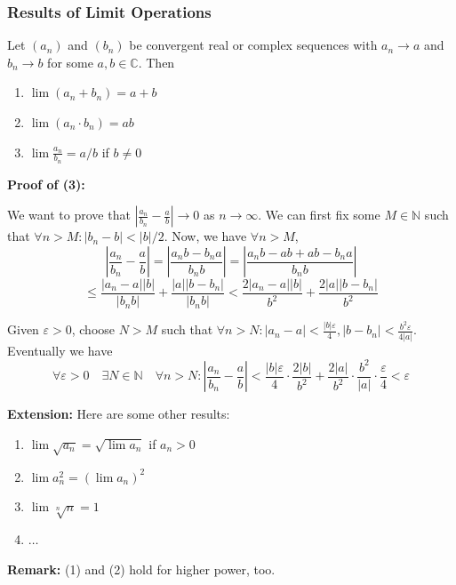 \documentclass[10pt, t]{beamer}
\newcommand{\N}{\mathbb{N}}
\begin{document}
\begin{frame}[allowframebreaks]
    \frametitle{Results of Limit Operations}
    Let $\left(a_{n}\right)$ and $\left(b_{n}\right)$ be convergent real or complex sequences with $a_{n} \rightarrow a$ and $b_{n} \rightarrow b$ for some $a, b \in \mathbb{C}$. Then
    \begin{enumerate}[(1)]
        \item 
        $\lim \left(a_{n}+b_{n}\right)=a+b$
        \item
        $\lim \left(a_{n} \cdot b_{n}\right)=a b$
        \item
        $\lim \frac{a_{n}}{b_{n}}=a / b$ if $b \neq 0$
    \end{enumerate}
    \textbf{Proof of (3):} \\
    {\footnotesize
    We want to prove that $\left|\frac{a_n}{b_n}-\frac{a}{b} \right|\rightarrow 0$ as $n\rightarrow \infty$. We can first fix some $M\in\N$ such that $\forall n>M:|b_n-b|<|b|/2$. Now, we have $\forall n>M$,
    $$\left|\frac{a_{n}}{b_{n}}-\frac{a}{b}\right|=\left|\frac{a_{n} b-b_{n} a}{b_{n} b}\right|=\left|\frac{a_{n} b-a b+a b-b_{n} a}{b_{n} b}\right| $$ 
    $$\leq \frac{\left|a_{n}-a\right||b|}{\left|b_{n} b\right|}+\frac{|a|\left|b-b_{n}\right|}{\left|b_{n} b\right|}<\frac{2\left|a_{n}-a\right||b|}{b^{2}}+\frac{2|a|\left|b-b_{n}\right|}{b^{2}}$$
    
    Given $\varepsilon>0$, choose $N>M$ such that $\forall n>N: |a_n-a|<\frac{|b|\varepsilon}{4},|b-b_n|<\frac{b^2\varepsilon}{4|a|}$. Eventually we have
    $$
        \forall \varepsilon>0\quad \exists N\in \N\quad \forall n>N:\left|\frac{a_{n}}{b_{n}}-\frac{a}{b}\right|<\frac{|b| \varepsilon}{4} \cdot \frac{2|b|}{b^{2}}+\frac{2|a|}{b^{2}} \cdot \frac{b^{2}}{|a|} \cdot \frac{\varepsilon}{4}<\varepsilon
    $$}
    \newpage
    \textbf{Extension:} Here are some other results:
    \begin{enumerate}[(1)]
        \item $\lim \sqrt{a_n}=\sqrt{\lim a_n}$ if $a_n>0$
        \item $\lim a_n^2=(\lim a_n)^2$
        \item $\lim \sqrt[n]{n}=1$
        \item $\dots$
    \end{enumerate}
    \textbf{Remark:} (1) and (2) hold for higher power, too.
\end{frame}
\end{document}
